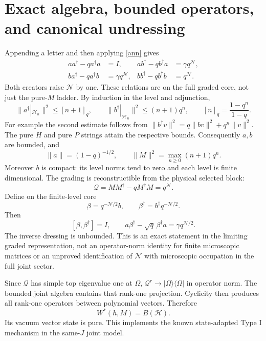 \documentclass[11pt]{article}
\newcommand{\HH}{\mathcal H}
\newcommand{\qn}[1]{[#1]_q}
\newcommand{\Q}{\mathcal Q}
\begin{document}
\newpage
\section{Exact algebra, bounded operators, and canonical undressing}
Appending a letter and then applying \eqref{ann} gives
\begin{align}\label{algebra}
 aa^\dagger-q a^\dagger a&=I,&
 ab^\dagger-q b^\dagger a&=\gamma q^{\mathcal N},\\
 ba^\dagger-q a^\dagger b&=\gamma q^{\mathcal N},&
 bb^\dagger-q b^\dagger b&=q^{\mathcal N}.
\end{align}
Both creators raise $\mathcal N$ by one. These relations are on
the full graded core, not just the pure-$M$ ladder.
By induction in the level and adjunction,
\begin{equation}\label{norms}
 \|a^\dagger|_{\HH_n}\|^2\le\qn{n+1},\qquad
 \|b^\dagger|_{\HH_n}\|^2\le(n+1)q^n,
 \qquad \qn n=\frac{1-q^n}{1-q}.
\end{equation}
For example the second estimate follows from
$\|b^\dagger v\|^2=q\|bv\|^2+q^n\|v\|^2$.
The pure $H$ and pure $P$ strings attain the respective bounds.
Consequently $a,b$ are bounded, and
\begin{equation}
 \|a\|=(1-q)^{-1/2},\qquad
 \|M\|^2=\max_{n\ge0}(n+1)q^n.
\end{equation}
Moreover $b$ is compact: its level norms tend to zero and each
level is finite dimensional. The grading is reconstructible from
the physical selected block:
\begin{equation}
 \Q=MM^\dagger-qM^\dagger M=q^{\mathcal N}.
\end{equation}
Define on the finite-level core
\begin{equation}
 \beta=q^{-\mathcal N/2}b,\qquad
 \beta^\dagger=b^\dagger q^{-\mathcal N/2}.
\end{equation}
Then
\begin{equation}\label{CCR}
 [\beta,\beta^\dagger]=I,\qquad
 a\beta^\dagger-\sqrt q\,\beta^\dagger a
       =\gamma q^{\mathcal N/2}.
\end{equation}
The inverse dressing is unbounded. This is an exact statement
in the limiting graded representation, not an operator-norm
identity for finite microscopic matrices or an unproved
identification of $\mathcal N$ with microscopic occupation in
the full joint sector.

Since $\Q$ has simple top eigenvalue one at $\Omega$,
$\Q^r\to|\Omega\rangle\langle\Omega|$ in operator norm.
The bounded joint algebra contains that rank-one projection.
Cyclicity then produces all rank-one operators between polynomial
vectors. Therefore
\begin{equation}
 W^*(h,M)=B(\HH).
\end{equation}
Its vacuum vector state is pure. This implements the known
state-adapted Type I mechanism \cite{RX} in the same-$J$ joint model.
\end{document}

